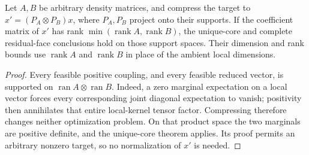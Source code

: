 \begin{corollary}
Let $A,B$ be arbitrary density matrices, and compress the target to
$x'=(P_A\otimes P_B)x$, where $P_A,P_B$ project onto their supports.
If the coefficient matrix of $x'$ has rank
$\min(\operatorname{rank}A,\operatorname{rank}B)$, the unique-core and
complete residual-face conclusions hold on those support spaces. Their
dimension and rank bounds use $\operatorname{rank}A$ and
$\operatorname{rank}B$ in place of the ambient local dimensions.
\end{corollary}
\begin{proof}
Every feasible positive coupling, and every feasible reduced vector, is
supported on $\operatorname{ran}A\otimes\operatorname{ran}B$. Indeed,
a zero marginal expectation on a local vector forces every corresponding
joint diagonal expectation to vanish; positivity then annihilates that
entire local-kernel tensor factor. Compressing therefore changes neither
optimization problem. On that product space the two marginals are
positive definite, and the unique-core theorem applies. Its proof permits
an arbitrary nonzero target, so no normalization of $x'$ is needed.
\end{proof}
